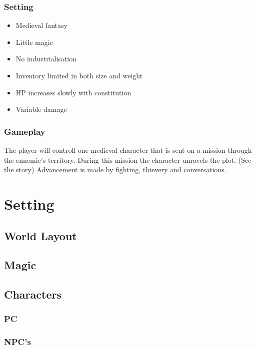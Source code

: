 \documentclass[a4paper]{report}
\begin{document}
		\section{Setting}

			\begin{itemize}
				\item Medieval fantasy
				\item Little magic
				\item No industrialisation
				\item Inventory limited in both size and weight
				\item HP increases slowly with constitution
				\item Variable damage
			\end{itemize}

		\section{Gameplay}

			The player will controll one medieval character that is sent on a mission through the ennemie's territory. During this mission the character unravels the plot. (See the story) Advancement is made by fighting, thievery and conversations.

\part{Setting}

	\chapter{World Layout}

	\chapter{Magic}

	\chapter{Characters}

		\section{PC}

		\section{NPC's}
\end{document}
